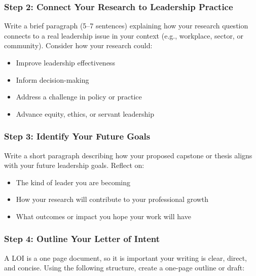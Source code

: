 \documentclass[
  letterpaper,
  DIV=11,
  numbers=noendperiod]{scrreprt}
\providecommand{\tightlist}{%
  \setlength{\itemsep}{0pt}\setlength{\parskip}{0pt}}\usepackage{longtable,booktabs,array}
\begin{document}
\subsubsection*{Step 2: Connect Your Research to Leadership
Practice}\label{step-2-connect-your-research-to-leadership-practice}

Write a brief paragraph (5--7 sentences) explaining how your research
question connects to a real leadership issue in your context (e.g.,
workplace, sector, or community). Consider how your research could:

\begin{itemize}
\tightlist
\item
  Improve leadership effectiveness
\item
  Inform decision-making
\item
  Address a challenge in policy or practice
\item
  Advance equity, ethics, or servant leadership
\end{itemize}

\subsubsection*{Step 3: Identify Your Future
Goals}\label{step-3-identify-your-future-goals}

Write a short paragraph describing how your proposed capstone or thesis
aligns with your future leadership goals. Reflect on:

\begin{itemize}
\tightlist
\item
  The kind of leader you are becoming
\item
  How your research will contribute to your professional growth
\item
  What outcomes or impact you hope your work will have
\end{itemize}

\subsubsection*{Step 4: Outline Your Letter of
Intent}\label{step-4-outline-your-letter-of-intent}

A LOI is a one page document, so it is important your writing is clear,
direct, and concise. Using the following structure, create a one-page
outline or draft:
\end{document}
